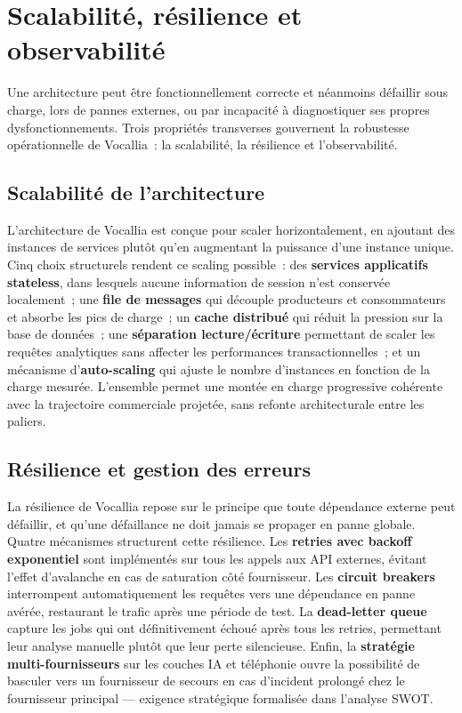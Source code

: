 \section{Scalabilité, résilience et observabilité}
\label{sec:scalabilite}

Une architecture peut être fonctionnellement correcte et néanmoins défaillir sous charge, lors de pannes externes, ou par incapacité à diagnostiquer ses propres dysfonctionnements. Trois propriétés transverses gouvernent la robustesse opérationnelle de Vocallia~: la scalabilité, la résilience et l'observabilité.

\subsection{Scalabilité de l'architecture}
\label{subsec:scal_architecture}

L'architecture de Vocallia est conçue pour scaler horizontalement, en ajoutant des instances de services plutôt qu'en augmentant la puissance d'une instance unique. Cinq choix structurels rendent ce scaling possible~: des \textbf{services applicatifs stateless}, dans lesquels aucune information de session n'est conservée localement~; une \textbf{file de messages} qui découple producteurs et consommateurs et absorbe les pics de charge~; un \textbf{cache distribué} qui réduit la pression sur la base de données~; une \textbf{séparation lecture/écriture} permettant de scaler les requêtes analytiques sans affecter les performances transactionnelles~; et un mécanisme d'\textbf{auto-scaling} qui ajuste le nombre d'instances en fonction de la charge mesurée. L'ensemble permet une montée en charge progressive cohérente avec la trajectoire commerciale projetée, sans refonte architecturale entre les paliers.

\subsection{Résilience et gestion des erreurs}
\label{subsec:scal_resilience}

La résilience de Vocallia repose sur le principe que toute dépendance externe peut défaillir, et qu'une défaillance ne doit jamais se propager en panne globale. Quatre mécanismes structurent cette résilience. Les \textbf{retries avec backoff exponentiel} sont implémentés sur tous les appels aux API externes, évitant l'effet d'avalanche en cas de saturation côté fournisseur. Les \textbf{circuit breakers} interrompent automatiquement les requêtes vers une dépendance en panne avérée, restaurant le trafic après une période de test. La \textbf{dead-letter queue} capture les jobs qui ont définitivement échoué après tous les retries, permettant leur analyse manuelle plutôt que leur perte silencieuse. Enfin, la \textbf{stratégie multi-fournisseurs} sur les couches IA et téléphonie ouvre la possibilité de basculer vers un fournisseur de secours en cas d'incident prolongé chez le fournisseur principal — exigence stratégique formalisée dans l'analyse SWOT.

